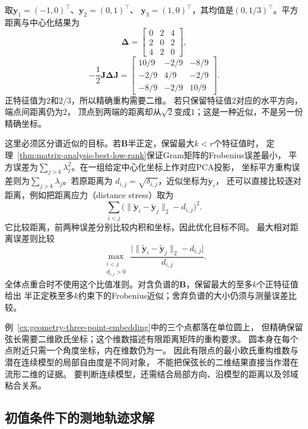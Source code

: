 \begin{example}[三个点能否放在一条直线上]
\label{ex:geometry-three-point-embedding}
取$\bm y_1=(-1,0)^\top$、$\bm y_2=(0,1)^\top$、
$\bm y_3=(1,0)^\top$，其均值是$(0,1/3)^\top$。平方距离与中心化结果为
\[
 \bm\Delta=\begin{bmatrix}0&2&4\\2&0&2\\4&2&0\end{bmatrix},
\]
\begin{equation}
 -\frac12\bm J\bm\Delta\bm J
 =\begin{bmatrix}
  10/9&-2/9&-8/9\\
  -2/9&4/9&-2/9\\
  -8/9&-2/9&10/9
 \end{bmatrix}.
 \label{eq:geometry-three-point-centered-gram}
\end{equation}
正特征值为$2$和$2/3$，所以精确重构需要二维。
若只保留特征值$2$对应的水平方向，端点间距离仍为$2$，
顶点到两端的距离却从$\sqrt2$变成$1$；这是一种近似，不是另一份精确坐标。
\end{example}

这里必须区分谱近似的目标。若$\bm B$半正定，保留最大$k<r$个特征值时，
定理~\ref{thm:matrix-analysis-best-low-rank}保证Gram矩阵的Frobenius误差最小，
平方误差为$\sum_{j>k}\lambda_j^2$。在一组给定中心化坐标上作对应PCA投影，
坐标平方重构误差则为$\sum_{j>k}\lambda_j$。若原距离为
$d_{i,j}=\sqrt{\delta_{i,j}}$，近似坐标为$\widetilde{\bm y}_i$，
还可以直接比较逐对距离，例如把距离应力（distance stress）取为
\[
 \sum_{i<j}
 \bigl(\lVert\widetilde{\bm y}_i-\widetilde{\bm y}_j\rVert_2-d_{i,j}\bigr)^2.
\]
它比较距离，前两种误差分别比较内积和坐标，因此优化目标不同。
最大相对距离误差则比较
\[
 \max_{\substack{i<j\\d_{i,j}>0}}
 \frac{\bigl|\lVert\widetilde{\bm y}_i-\widetilde{\bm y}_j\rVert_2-d_{i,j}\bigr|}
 {d_{i,j}}.
\]
全体点重合时不使用这个比值准则。对含负谱的$\bm B$，保留最大的至多$k$个正特征值给出
半正定秩至多$k$约束下的Frobenius近似；舍弃负谱的大小仍须与测量误差比较。

例~\ref{ex:geometry-three-point-embedding}中的三个点都落在单位圆上，
但精确保留弦长需要二维欧氏坐标；这个维数描述有限距离矩阵的重构要求。
圆本身在每个点附近只需一个角度坐标，内在维数仍为一。
因此有限点的最小欧氏重构维数与潜在连续模型的局部自由度是不同对象，
不能把保弦长的二维结果直接当作潜在流形二维的证据。
要判断连续模型，还需结合局部方向、沿模型的距离以及邻域粘合关系。

\subsection{初值条件下的测地轨迹求解}
\label{sec:geometry-geodesic-initial-value}

